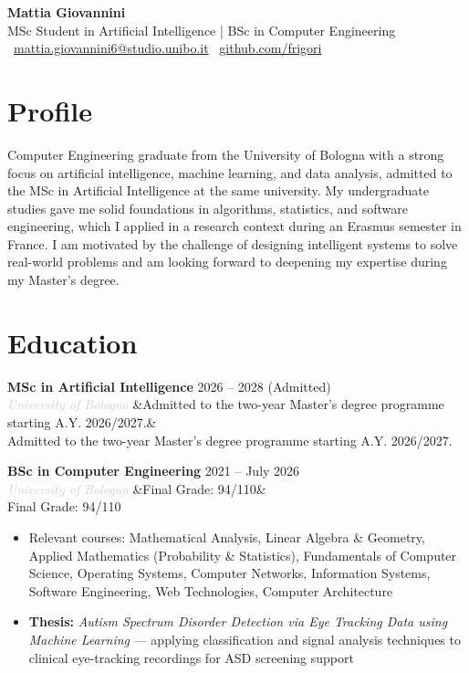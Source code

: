 \documentclass[a4paper,10pt]{article}
\newcommand{\entry}[4]{%
  \noindent\textbf{#1} \hfill \textcolor{accent}{#2}\\
  \textit{\textcolor{lightgray}{#3}}%
  \ifx&#4&\else\\\vspace{0.2em}#4\fi
  \vspace{0.5em}
}
\newcommand{\entrylist}[5]{%
  \noindent\textbf{#1} \hfill \textcolor{accent}{#2}\\
  \textit{\textcolor{lightgray}{#3}}%
  \ifx&#4&\else\\\vspace{0.2em}#4\fi
  \vspace{0.3em}
  \begin{itemize}#5\end{itemize}
  \vspace{0.3em}
}
\begin{document}
\begin{center}
  {\Huge\bfseries\color{darkgray} Mattia Giovannini}\\[0.4em]
  {\large\color{accent} MSc Student in Artificial Intelligence | BSc in Computer Engineering}\\[0.7em]
  \textcolor{lightgray}{
    \faEnvelope\ \href{mailto:mattia.giovannini6@studio.unibo.it}{mattia.giovannini6@studio.unibo.it}
    \quad\textbullet\quad
    \faGithub\ \href{https://github.com/frigori}{github.com/frigori}
  }
\end{center}

\vspace{0.5em}

\section{Profile}

Computer Engineering graduate from the University of Bologna with a strong focus on artificial
intelligence, machine learning, and data analysis, admitted to the MSc in Artificial Intelligence
at the same university. My undergraduate studies gave me solid foundations in algorithms, statistics,
and software engineering, which I applied in a research context during an Erasmus semester in France.
I am motivated by the challenge of designing intelligent systems to solve real-world problems and
am looking forward to deepening my expertise during my Master's degree.

\section{Education}

\entry{MSc in Artificial Intelligence}{2026 -- 2028 (Admitted)}{University of Bologna}
{Admitted to the two-year Master's degree programme starting A.Y. 2026/2027.}

\entrylist{BSc in Computer Engineering}{2021 -- July 2026}{University of Bologna}{Final Grade: 94/110}{
  \item Relevant courses: Mathematical Analysis, Linear Algebra \& Geometry,
        Applied Mathematics (Probability \& Statistics), Fundamentals of Computer Science,
        Operating Systems, Computer Networks, Information Systems,
        Software Engineering, Web Technologies, Computer Architecture
  \item \textbf{Thesis:} \textit{Autism Spectrum Disorder Detection via Eye Tracking Data
        using Machine Learning} — applying classification and signal analysis techniques
        to clinical eye-tracking recordings for ASD screening support
}
\end{document}
